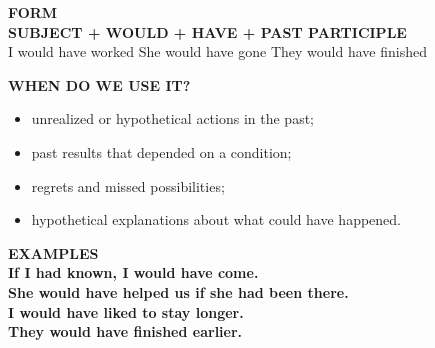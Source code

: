 \documentclass[a4paper,11pt]{article}
\begin{document}
\vspace{2.5mm}\hspace*{6mm}
\begin{minipage}{0.91\textwidth}

\begin{violetbox}
\textbf{\color{VioletDark}FORM}\\[1mm]
\centering
{\Large \textbf{SUBJECT + WOULD + HAVE + PAST PARTICIPLE}}\\[1mm]
\small
I would have worked \quad She would have gone \quad They would have finished
\end{violetbox}

\vspace{2.5mm}
\begin{center}
\end{center}

\vspace{1.5mm}
\begin{violetbox}
\textbf{\color{VioletDark}WHEN DO WE USE IT?}\\[1mm]
\begin{itemize}\setlength{\itemsep}{0.4mm}
\item unrealized or hypothetical actions in the past;
\item past results that depended on a condition;
\item regrets and missed possibilities;
\item hypothetical explanations about what could have happened.
\end{itemize}
\end{violetbox}

\vspace{2mm}
\begin{violetbox}
\textbf{\color{VioletDark}EXAMPLES}\\[1mm]
\textbf{If I had known, I would have come.}\\
\textbf{She would have helped us if she had been there.}\\
\textbf{I would have liked to stay longer.}\\
\textbf{They would have finished earlier.}
\end{violetbox}


\end{minipage}
\end{document}
